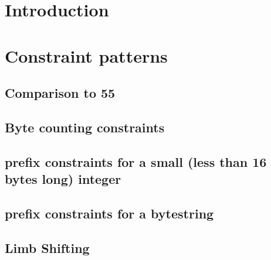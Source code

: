 \section{Introduction}

\section{Constraint patterns}
\subsection{Comparison to 55}                                                            
\subsection{Byte counting constraints}                                                   
\subsection{\rlp{} prefix constraints for a small (less than 16 bytes long) integer}     
\subsection{\rlp{} prefix constraints for a bytestring}                                  
\subsection{Limb Shifting}                                                               

